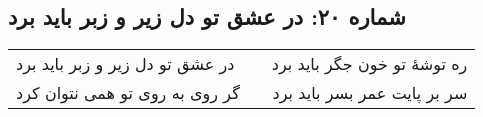 \begin{center}
\section*{شماره ۲۰: در عشق تو دل زیر و زبر باید برد}
\label{sec:020}
\begin{longtable}{l p{0.5cm} r}
در عشق تو دل زیر و زبر باید برد
&&
ره توشهٔ تو خون جگر باید برد
\\
گر روی به روی تو همی نتوان کرد
&&
سر بر پایت عمر بسر باید برد
\\
\end{longtable}
\end{center}
